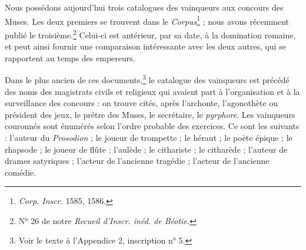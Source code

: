 \documentclass[a4paper, 11pt, oneside, polutonikogreek, french]{article}
\begin{document}
Nous possédons aujourd'hui trois catalogues des vainqueurs aux concours des Muses. Les deux premiers se trouvent dans le \emph{Corpus}\footnote{\emph{Corp. Inscr.} 1585, 1586.} ; nous avons récemment publié le troisième.\footnote{N° 26 de notre \emph{Recueil d'Inscr. inéd. de Béotie.}} Celui-ci est antérieur, par sa date, à la domination romaine, et peut ainsi fournir une comparaison intéressante avec les deux autres, qui se rapportent au temps des empereurs.

Dans le plus ancien de ces documents,\footnote{Voir le texte à l'Appendice 2, inscription n° 5.} le catalogue des vainqueurs est précédé des noms des magistrats civils et religieux qui avaient part à l'organisation et à la surveillance des concours : on trouve cités, après l'archonte, l'agonothète ou président des jeux, le prêtre des Muses, le secrétaire, le \emph{pyrphore}. Les vainqueurs couronnés sont énumérés selon l'ordre probable des exercices. Ce sont les suivants : l'auteur du \emph{Prosodion} ; le joueur de trompette ; le héraut ; le poète épique ; le rhapsode ; le joueur de flûte ; l'aulède ; le cithariste ; le citharède ; l'auteur de drames satyriques ; l'acteur de l'ancienne tragédie ; l'acteur de l'ancienne comédie.
\end{document}
